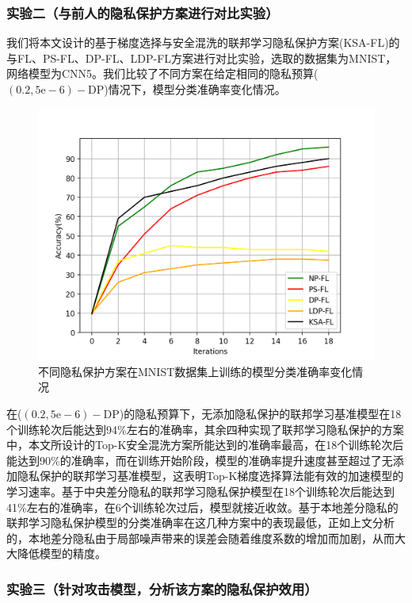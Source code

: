 \subsubsection{实验二（与前人的隐私保护方案进行对比实验）} 
我们将本文设计的基于梯度选择与安全混洗的联邦学习隐私保护方案(KSA-FL)的与FL、PS-FL、DP-FL、LDP-FL方案进行对比实验，选取的数据集为MNIST，网络模型为CNN5。我们比较了不同方案在给定相同的隐私预算($(0.2,5 \mathrm{e}-6)-\mathrm{DP}$)情况下，模型分类准确率变化情况。

\begin{figure}[!hbt]
\centering
  	\includegraphics[scale=0.6]{fig2/C4/实验二}%
	\caption{不同隐私保护方案在MNIST数据集上训练的模型分类准确率变化情况}
  	\label{fig:不同隐私保护方案在MNIST数据集上训练的模型分类准确率变化情况} 
\end{figure}

在($(0.2,5 \mathrm{e}-6)-\mathrm{DP}$)的隐私预算下，无添加隐私保护的联邦学习基准模型在18个训练轮次后能达到94\%左右的准确率，其余四种实现了联邦学习隐私保护的方案中，本文所设计的Top-K安全混洗方案所能达到的准确率最高，在18个训练轮次后能达到90\%的准确率，而在训练开始阶段，模型的准确率提升速度甚至超过了无添加隐私保护的联邦学习基准模型，这表明Top-K梯度选择算法能有效的加速模型的学习速率。基于中央差分隐私的联邦学习隐私保护模型在18个训练轮次后能达到41\%左右的准确率，在6个训练轮次过后，模型就接近收敛。基于本地差分隐私的联邦学习隐私保护模型的分类准确率在这几种方案中的表现最低，正如上文分析的，本地差分隐私由于局部噪声带来的误差会随着维度系数的增加而加剧，从而大大降低模型的精度。

\subsubsection{实验三（针对攻击模型，分析该方案的隐私保护效用）} 

